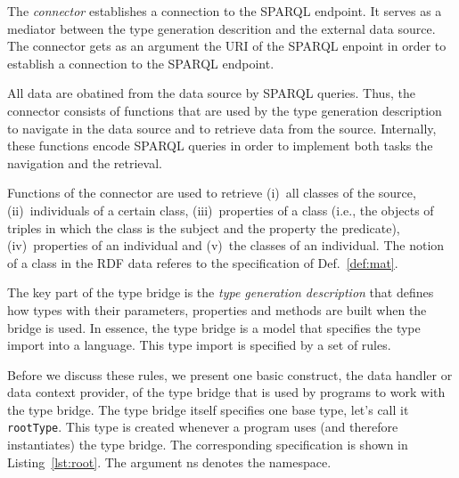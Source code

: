 \documentclass{llncs} %
\newcommand{\ggr}[1]{} %
\begin{document}
The \emph{connector} establishes a connection to the SPARQL endpoint. It serves as a mediator
between the type generation descrition and the external data source.
The connector gets as an argument the URI of the SPARQL enpoint
in order to establish a connection to the SPARQL endpoint.

All data are obatined from the data source by SPARQL queries.
Thus, the connector consists of functions that are used by the type generation description
to navigate in the data source and to retrieve data from the source.
Internally, these functions encode SPARQL queries in order to implement both tasks the navigation and the retrieval.

Functions of the connector are used to retrieve (i)~all classes of the source,
(ii)~individuals of a certain class, (iii)~properties of a class (i.e., the objects of
triples in which the class is the subject and the property the predicate),
(iv)~properties of an individual and (v)~the classes of an individual.
The notion of a class in the RDF data referes to the specification of Def.~\ref{def:mat}.


%
%
%



The key part of the type bridge is the \emph{type generation description} that
defines how types with their parameters, properties and methods are built when the bridge is used.
In essence, the type bridge is a model that specifies the type import into a language.
This type import is specified by a set of rules. 

Before we discuss these rules, we present one basic construct, the data handler or data context provider,
 of the type bridge that is  used by programs to work with the type bridge.
The type bridge itself specifies one base type, let's call it \texttt{rootType}. This type
is created whenever a program uses (and therefore instantiates) the type bridge.
The corresponding specification is shown in Listing~\ref{lst:root}. The argument ns denotes the namespace.
\end{document}
